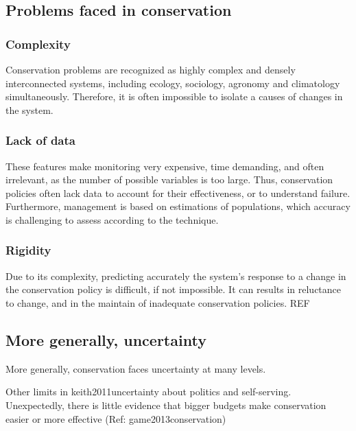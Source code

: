 \documentclass[12pt,a4paper]{article}
\begin{document}
\subsection{Problems faced in conservation}

\subsubsection{Complexity}
Conservation problems are recognized as highly complex and densely interconnected systems, including ecology, sociology, agronomy and climatology simultaneously.
Therefore, it is often impossible to isolate a causes of changes in the system.

\subsubsection{Lack of data}
These features make monitoring very expensive, time demanding, and often irrelevant, as the number of possible variables is too large.
Thus, conservation policies often lack data to account for their effectiveness, or to understand failure.
Furthermore, management is based on estimations of populations, which accuracy is challenging to assess according to the technique.

\subsubsection{Rigidity}
Due to its complexity, predicting accurately the system's response to a change in the conservation policy is difficult, if not impossible.
It can results in reluctance to change, and in the maintain of inadequate conservation policies. REF

\subsection{More generally, uncertainty}
More generally, conservation faces uncertainty at many levels.

Other limits in keith2011uncertainty about politics and self-serving.
Unexpectedly, there is little  evidence that bigger budgets make conservation easier or more effective (Ref: game2013conservation)
\end{document}
